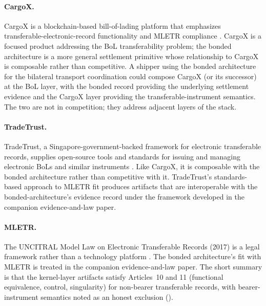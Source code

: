 \documentclass[11pt,a4paper]{article}
\theoremstyle{definition}
\theoremstyle{remark}
\begin{document}
\paragraph{CargoX.}
CargoX is a blockchain-based bill-of-lading platform that
emphasizes transferable-electronic-record functionality and
MLETR compliance \citep{cargox_2023}. CargoX is a focused product
addressing the BoL transferability problem; the bonded
architecture is a more general settlement primitive whose
relationship to CargoX is composable rather than competitive. A
shipper using the bonded architecture for the bilateral
transport coordination could compose CargoX (or its successor) at
the BoL layer, with the bonded record providing the underlying
settlement evidence and the CargoX layer providing the
transferable-instrument semantics. The two are not in
competition; they address adjacent layers of the stack.

\paragraph{TradeTrust.}
TradeTrust, a Singapore-government-backed framework for
electronic transferable records, supplies open-source tools and
standards for issuing and managing electronic BoLs and similar
instruments \citep{tradetrust_2023}. Like CargoX, it is composable
with the bonded architecture rather than competitive with it.
TradeTrust's standards-based approach to MLETR fit produces
artifacts that are interoperable with the
bonded-architecture's evidence record under the framework
developed in the companion evidence-and-law paper.

\paragraph{MLETR.}
The UNCITRAL Model Law on Electronic Transferable Records (2017)
is a legal framework rather than a technology platform
\citep{uncitral_mletr_2017}. The bonded architecture's fit with
MLETR is treated in the companion evidence-and-law paper. The
short summary is that the kernel-layer artifacts satisfy
Articles~10 and 11 (functional equivalence, control, singularity)
for non-bearer transferable records, with bearer-instrument
semantics noted as an honest exclusion ().
\end{document}
